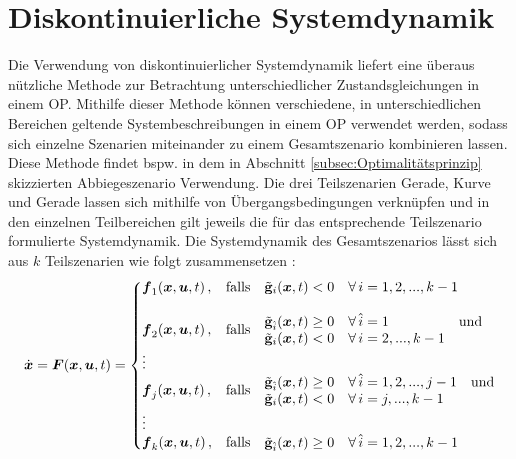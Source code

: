 \section{Diskontinuierliche Systemdynamik}\label{sec:Diskontinuität}
Die Verwendung von diskontinuierlicher Systemdynamik liefert eine überaus nützliche Methode zur Betrachtung unterschiedlicher Zustandsgleichungen in einem \gls{OP}. Mithilfe dieser Methode können verschiedene, in unterschiedlichen Bereichen geltende Systembeschreibungen in einem \gls{OP} verwendet werden, sodass sich einzelne Szenarien miteinander zu einem Gesamtszenario kombinieren lassen. Diese Methode findet bspw. in dem in Abschnitt \ref{subsec:Optimalitätsprinzip} skizzierten Abbiegeszenario Verwendung. Die drei Teilszenarien Gerade, Kurve und Gerade lassen sich mithilfe von Übergangsbedingungen verknüpfen und in den einzelnen Teilbereichen gilt jeweils die für das entsprechende Teilszenario formulierte Systemdynamik. Die Systemdynamik des Gesamtszenarios lässt sich aus $k$ Teilszenarien wie folgt zusammensetzen \cite{Papageorgiou.2012}:
\begin{equation}
\dx = \ve{F}(\ve{x},\ve{u},t) = \left\{\begin{matrix*}[l]
\ve{f}_1(\ve{x},\ve{u},t)\,, & \mathrm{falls} & \begin{matrix}\tilde{\mathbf{g}}_i(\ve{x},t) < 0 &\forall\, i = 1,2,...,k-1\end{matrix}\\
&\\
\ve{f}_2(\ve{x},\ve{u},t)\,, & \mathrm{falls} & 
\begin{matrix*}[l]
\tilde{\mathbf{g}}_{\hat{i}}(\ve{x},t) \geq 0 &\forall\, \hat{i} = 1 &\textrm{und} \\ \tilde{\mathbf{g}}_i(\ve{x},t) < 0 &\forall\, i = 2,...,k-1&
\end{matrix*}
\\
\vdots & & \\
\ve{f}_j(\ve{x},\ve{u},t)\,, & \mathrm{falls} & \begin{matrix*}[l]
\tilde{\mathbf{g}}_{\hat{i}}(\ve{x},t) \geq 0 &\forall \, \hat{i} = 1,2,...,j-1 &\textrm{und} \\ \tilde{\mathbf{g}}_i(\ve{x},t) < 0 &\forall\, i = j,...,k-1&
\end{matrix*}\\
\vdots & & \\
\ve{f}_k(\ve{x},\ve{u},t)\,, & \mathrm{falls} & \begin{matrix}\tilde{\mathbf{g}}_{\hat{i}}(\ve{x},t) \geq 0 &\forall\, \hat{i} = 1,2,...,k-1
\end{matrix}
\end{matrix*}\right. \label{eq:Diskontinuität}
\end{equation}
